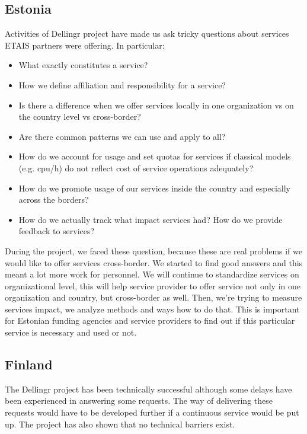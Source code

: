 \documentclass{article}
\newcommand{\dell}{Dellingr\xspace}
\begin{document}
\subsection{Estonia}

Activities of \dell project have made us ask tricky questions about services ETAIS partners were offering. In particular:
\begin{itemize}
\item What exactly constitutes a service? 
\item How we define affiliation and responsibility for a service?
\item Is there a difference when we offer services locally in one organization vs on the country level vs cross-border?
\item Are there common patterns we can use and apply to all?
\item How do we account for usage and set quotas for services if classical models (e.g. cpu/h) do not reflect cost of service operations adequately?
\item How do we promote usage of our services inside the country and especially across the borders?
\item How do we actually track what impact services had? How do we provide feedback to services?
\end{itemize}

During the project, we faced these question, because these are real problems if we would like to offer services cross-border. 
We started to find good answers and this meant a lot more work for personnel. We will continue to standardize services on organizational level, this will help service provider to offer service not only in one organization and country, but cross-border as well. 
Then, we're trying to measure services impact, we analyze methods and ways how to do that. 
This is important for Estonian funding agencies and service providers to find out if this particular service is necessary and used or not. 

\subsection{Finland}

The \dell project has been technically successful although some delays have been experienced in answering some requests. 
The way of delivering these requests would have to be developed further if a continuous service would be put up. 
The project has also shown that no technical barriers exist.
\end{document}
